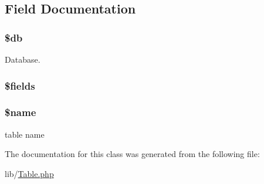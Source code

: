 \subsection{Field Documentation}
\hypertarget{class_table_a1fa3127fc82f96b1436d871ef02be319}{
\subsubsection[{\$db}]{\setlength{\rightskip}{0pt plus 5cm}\$db\hspace{0.3cm}{\ttfamily [protected]}}}\label{class_table_a1fa3127fc82f96b1436d871ef02be319}


Database. 

\hypertarget{class_table_ab2303c817e3b402b77b7f99627b9c319}{
\subsubsection[{\$fields}]{\setlength{\rightskip}{0pt plus 5cm}\$fields\hspace{0.3cm}{\ttfamily [protected]}}}\label{class_table_ab2303c817e3b402b77b7f99627b9c319}
\hypertarget{class_table_ab2fc40d43824ea3e1ce5d86dee0d763b}{
\subsubsection[{\$name}]{\setlength{\rightskip}{0pt plus 5cm}\$name\hspace{0.3cm}{\ttfamily [protected]}}}\label{class_table_ab2fc40d43824ea3e1ce5d86dee0d763b}


table name 



The documentation for this class was generated from the following file\-:\begin{DoxyCompactItemize}
\item 
lib/\hyperlink{_table_8php}{Table.\-php}\end{DoxyCompactItemize}

